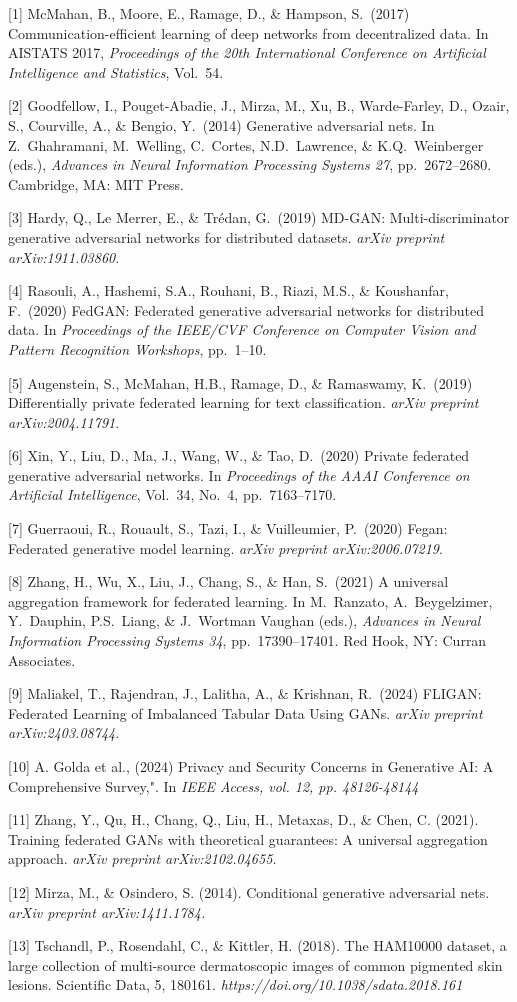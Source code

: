 \documentclass{article}
\begin{document}
{
\small
[1] McMahan, B., Moore, E., Ramage, D., \& Hampson, S.\ (2017) Communication-efficient learning of deep networks from decentralized data. In AISTATS 2017, {\it Proceedings of the 20th International Conference on Artificial Intelligence and Statistics}, Vol.\ 54.

[2] Goodfellow, I., Pouget-Abadie, J., Mirza, M., Xu, B., Warde-Farley, D., Ozair, S., Courville, A., \& Bengio, Y.\ (2014) Generative adversarial nets. In Z.\ Ghahramani, M.\ Welling, C.\ Cortes, N.D.\ Lawrence, \& K.Q.\ Weinberger (eds.), {\it Advances in Neural Information Processing Systems 27}, pp.\ 2672--2680. Cambridge, MA: MIT Press.

[3] Hardy, Q., Le Merrer, E., \& Trédan, G.\ (2019) MD-GAN: Multi-discriminator generative adversarial networks for distributed datasets. {\it arXiv preprint arXiv:1911.03860}.

[4] Rasouli, A., Hashemi, S.A., Rouhani, B., Riazi, M.S., \& Koushanfar, F.\ (2020) FedGAN: Federated generative adversarial networks for distributed data. In {\it Proceedings of the IEEE/CVF Conference on Computer Vision and Pattern Recognition Workshops}, pp.\ 1--10.

[5] Augenstein, S., McMahan, H.B., Ramage, D., \& Ramaswamy, K.\ (2019) Differentially private federated learning for text classification. {\it arXiv preprint arXiv:2004.11791}.

[6] Xin, Y., Liu, D., Ma, J., Wang, W., \& Tao, D.\ (2020) Private federated generative adversarial networks. In {\it Proceedings of the AAAI Conference on Artificial Intelligence}, Vol.\ 34, No.\ 4, pp.\ 7163--7170.

[7] Guerraoui, R., Rouault, S., Tazi, I., \& Vuilleumier, P.\ (2020) Fegan: Federated generative model learning. {\it arXiv preprint arXiv:2006.07219}.

[8] Zhang, H., Wu, X., Liu, J., Chang, S., \& Han, S.\ (2021) A universal aggregation framework for federated learning. In M.\ Ranzato, A.\ Beygelzimer, Y.\ Dauphin, P.S.\ Liang, \& J.\ Wortman Vaughan (eds.), {\it Advances in Neural Information Processing Systems 34}, pp.\ 17390--17401. Red Hook, NY: Curran Associates.

[9] Maliakel, T., Rajendran, J., Lalitha, A., \& Krishnan, R.\ (2024) FLIGAN: Federated Learning of Imbalanced Tabular Data Using GANs. {\it arXiv preprint arXiv:2403.08744}.

[10] A. Golda et al., (2024) Privacy and Security Concerns in Generative AI: A Comprehensive Survey,". In {\it IEEE Access, vol. 12, pp. 48126-48144}

[11] Zhang, Y., Qu, H., Chang, Q., Liu, H., Metaxas, D., & Chen, C. (2021). Training federated GANs with theoretical guarantees: A universal aggregation approach. {\it arXiv preprint arXiv:2102.04655.}

[12] Mirza, M., & Osindero, S. (2014). Conditional generative adversarial nets. {\it arXiv preprint arXiv:1411.1784.}

[13] Tschandl, P., Rosendahl, C., & Kittler, H. (2018). The HAM10000 dataset, a large collection of multi-source dermatoscopic images of common pigmented skin lesions. Scientific Data, 5, 180161. {\it https://doi.org/10.1038/sdata.2018.161}

}
\end{document}
